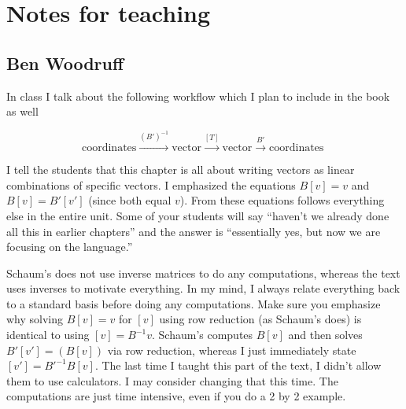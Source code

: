 \section{Notes for teaching}


\subsection{Ben Woodruff}

In class I talk about the following workflow which I plan to include in the book as well

$$\text{coordinates} \xrightarrow{(B')^{-1}} \text{vector} \xrightarrow{[T]} \text{vector} \xrightarrow{B'} \text{coordinates }$$

I tell the students that this chapter is all about writing vectors as linear combinations of specific vectors.
I emphasized the equations  $B [v] = v$ and $B[v] = B' [v']$ (since both equal $v$).  From these equations follows everything else in the entire unit. Some of your students will say ``haven't we already done all this in earlier chapters'' and the answer is ``essentially yes, but now we are focusing on the language.''

Schaum's does not use inverse matrices to do any computations, whereas the text uses inverses to motivate everything. In my mind, I always relate everything back to a standard basis before doing any computations.  Make sure you emphasize why solving $B[v]=v$ for $[v]$ using row reduction (as Schaum's does) is identical to using $[v]=B^{-1} v$.  Schaum's computes $B[v]$ and then solves $B'[v'] = (B[v])$ via row reduction, whereas I just immediately state $[v'] = B'^{-1} B[v]$.  The last time I taught this part of the text, I didn't allow them to use calculators.  I may consider changing that this time. The computations are just time intensive, even if you do a 2 by 2 example. 



